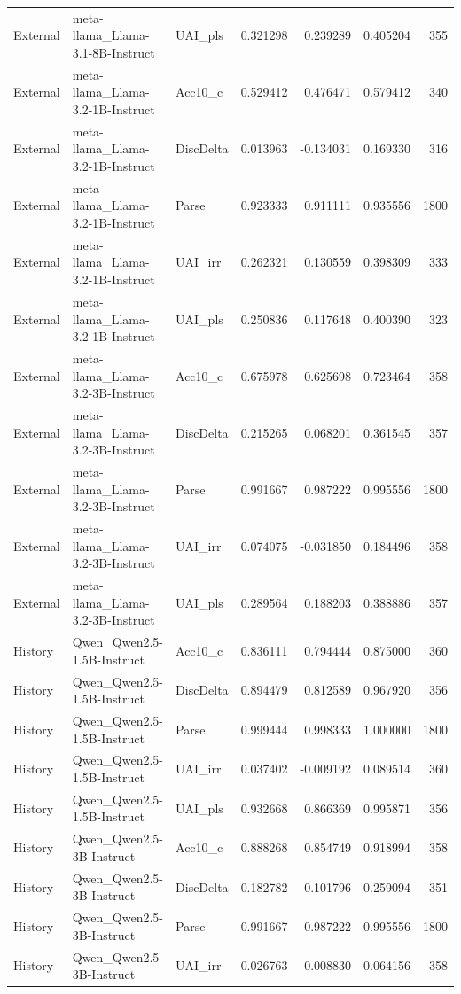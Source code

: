 \begin{tabular}{lllrrrr}
External & meta-llama_Llama-3.1-8B-Instruct & UAI_pls & 0.321298 & 0.239289 & 0.405204 & 355 \\
External & meta-llama_Llama-3.2-1B-Instruct & Acc10_c & 0.529412 & 0.476471 & 0.579412 & 340 \\
External & meta-llama_Llama-3.2-1B-Instruct & DiscDelta & 0.013963 & -0.134031 & 0.169330 & 316 \\
External & meta-llama_Llama-3.2-1B-Instruct & Parse & 0.923333 & 0.911111 & 0.935556 & 1800 \\
External & meta-llama_Llama-3.2-1B-Instruct & UAI_irr & 0.262321 & 0.130559 & 0.398309 & 333 \\
External & meta-llama_Llama-3.2-1B-Instruct & UAI_pls & 0.250836 & 0.117648 & 0.400390 & 323 \\
External & meta-llama_Llama-3.2-3B-Instruct & Acc10_c & 0.675978 & 0.625698 & 0.723464 & 358 \\
External & meta-llama_Llama-3.2-3B-Instruct & DiscDelta & 0.215265 & 0.068201 & 0.361545 & 357 \\
External & meta-llama_Llama-3.2-3B-Instruct & Parse & 0.991667 & 0.987222 & 0.995556 & 1800 \\
External & meta-llama_Llama-3.2-3B-Instruct & UAI_irr & 0.074075 & -0.031850 & 0.184496 & 358 \\
External & meta-llama_Llama-3.2-3B-Instruct & UAI_pls & 0.289564 & 0.188203 & 0.388886 & 357 \\
History & Qwen_Qwen2.5-1.5B-Instruct & Acc10_c & 0.836111 & 0.794444 & 0.875000 & 360 \\
History & Qwen_Qwen2.5-1.5B-Instruct & DiscDelta & 0.894479 & 0.812589 & 0.967920 & 356 \\
History & Qwen_Qwen2.5-1.5B-Instruct & Parse & 0.999444 & 0.998333 & 1.000000 & 1800 \\
History & Qwen_Qwen2.5-1.5B-Instruct & UAI_irr & 0.037402 & -0.009192 & 0.089514 & 360 \\
History & Qwen_Qwen2.5-1.5B-Instruct & UAI_pls & 0.932668 & 0.866369 & 0.995871 & 356 \\
History & Qwen_Qwen2.5-3B-Instruct & Acc10_c & 0.888268 & 0.854749 & 0.918994 & 358 \\
History & Qwen_Qwen2.5-3B-Instruct & DiscDelta & 0.182782 & 0.101796 & 0.259094 & 351 \\
History & Qwen_Qwen2.5-3B-Instruct & Parse & 0.991667 & 0.987222 & 0.995556 & 1800 \\
History & Qwen_Qwen2.5-3B-Instruct & UAI_irr & 0.026763 & -0.008830 & 0.064156 & 358 \\

\end{tabular}
